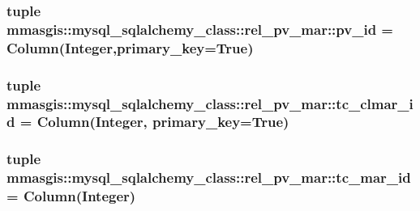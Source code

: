 \label{classmmasgis_1_1mysql__sqlalchemy__class_1_1rel__pv__mar_aa64e406aba066279966755f95b78c55b}
\hypertarget{classmmasgis_1_1mysql__sqlalchemy__class_1_1rel__pv__mar_a3050dac9d4d049ca8af06472c5d00aa3}{
\subsubsection[{pv\_\-id}]{\setlength{\rightskip}{0pt plus 5cm}tuple {\bf mmasgis::mysql\_\-sqlalchemy\_\-class::rel\_\-pv\_\-mar::pv\_\-id} = Column(Integer,primary\_\-key=True)}}
\label{classmmasgis_1_1mysql__sqlalchemy__class_1_1rel__pv__mar_a3050dac9d4d049ca8af06472c5d00aa3}
\hypertarget{classmmasgis_1_1mysql__sqlalchemy__class_1_1rel__pv__mar_af1b4ade28cdec76a32a638f17d161290}{
\subsubsection[{tc\_\-clmar\_\-id}]{\setlength{\rightskip}{0pt plus 5cm}tuple {\bf mmasgis::mysql\_\-sqlalchemy\_\-class::rel\_\-pv\_\-mar::tc\_\-clmar\_\-id} = Column(Integer, primary\_\-key=True)}}
\label{classmmasgis_1_1mysql__sqlalchemy__class_1_1rel__pv__mar_af1b4ade28cdec76a32a638f17d161290}
\hypertarget{classmmasgis_1_1mysql__sqlalchemy__class_1_1rel__pv__mar_a1dd3a942d6f45bf240397cdf80aa8340}{
\subsubsection[{tc\_\-mar\_\-id}]{\setlength{\rightskip}{0pt plus 5cm}tuple {\bf mmasgis::mysql\_\-sqlalchemy\_\-class::rel\_\-pv\_\-mar::tc\_\-mar\_\-id} = Column(Integer)}}
